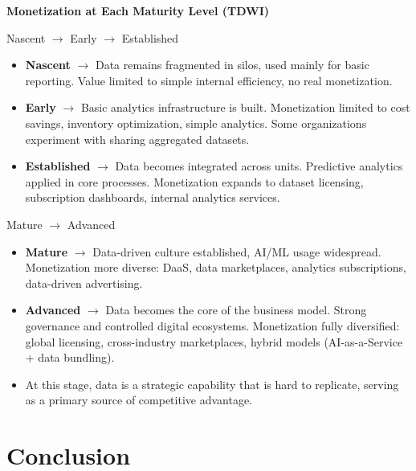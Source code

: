 \documentclass[aspectratio=169, table]{beamer}
\begin{document}
\begin{frame}{\hfill}
	\centering
	\Huge{\textbf{Monetization at Each Maturity Level (TDWI)}}
\end{frame}

\begin{frame}{Nascent $\rightarrow$ Early $\rightarrow$ Established}
	\vspace{12pt}
	\begin{itemize}
		\item \textbf{Nascent} $\rightarrow$ Data remains fragmented in silos, used mainly for basic reporting. Value limited to simple internal efficiency, no real monetization.  
		\item \textbf{Early} $\rightarrow$ Basic analytics infrastructure is built. Monetization limited to cost savings, inventory optimization, simple analytics. Some organizations experiment with sharing aggregated datasets.  
		\item \textbf{Established} $\rightarrow$ Data becomes integrated across units. Predictive analytics applied in core processes. Monetization expands to dataset licensing, subscription dashboards, internal analytics services.  
	\end{itemize}
\end{frame}

\begin{frame}{Mature $\rightarrow$ Advanced}
	\vspace{12pt}
	\begin{itemize}
		\item \textbf{Mature} $\rightarrow$ Data-driven culture established, AI/ML usage widespread. Monetization more diverse: DaaS, data marketplaces, analytics subscriptions, data-driven advertising.  
		\item \textbf{Advanced} $\rightarrow$ Data becomes the core of the business model. Strong governance and controlled digital ecosystems. Monetization fully diversified: global licensing, cross-industry marketplaces, hybrid models (AI-as-a-Service + data bundling).  
		\item At this stage, data is a strategic capability that is hard to replicate, serving as a primary source of competitive advantage.  
	\end{itemize}
\end{frame}


\section{Conclusion}
\end{document}

